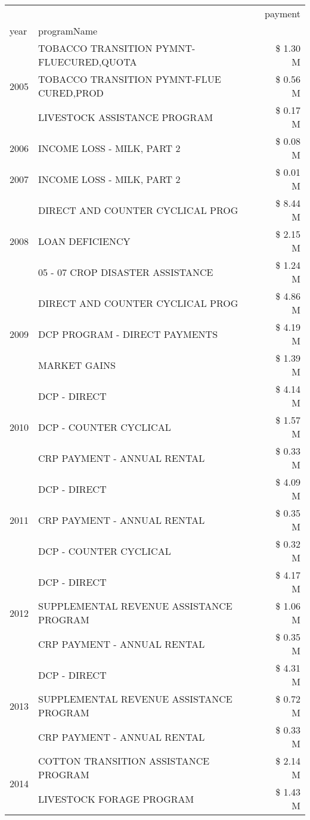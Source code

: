 \begin{tabular}{llr}
\toprule
 &  & payment \\
year & programName &  \\
\midrule
\multirow[t]{3}{*}{2005} & TOBACCO TRANSITION PYMNT-FLUECURED,QUOTA & \$ 1.30 M \\
 & TOBACCO TRANSITION PYMNT-FLUE CURED,PROD & \$ 0.56 M \\
 & LIVESTOCK ASSISTANCE PROGRAM & \$ 0.17 M \\
\cline{1-3}
2006 & INCOME LOSS - MILK, PART 2 & \$ 0.08 M \\
\cline{1-3}
2007 & INCOME LOSS - MILK, PART 2 & \$ 0.01 M \\
\cline{1-3}
\multirow[t]{3}{*}{2008} & DIRECT AND COUNTER CYCLICAL PROG & \$ 8.44 M \\
 & LOAN DEFICIENCY & \$ 2.15 M \\
 & 05 - 07 CROP DISASTER ASSISTANCE & \$ 1.24 M \\
\cline{1-3}
\multirow[t]{3}{*}{2009} & DIRECT AND COUNTER CYCLICAL PROG & \$ 4.86 M \\
 & DCP PROGRAM - DIRECT PAYMENTS & \$ 4.19 M \\
 & MARKET GAINS & \$ 1.39 M \\
\cline{1-3}
\multirow[t]{3}{*}{2010} & DCP - DIRECT & \$ 4.14 M \\
 & DCP - COUNTER CYCLICAL & \$ 1.57 M \\
 & CRP PAYMENT - ANNUAL RENTAL & \$ 0.33 M \\
\cline{1-3}
\multirow[t]{3}{*}{2011} & DCP - DIRECT & \$ 4.09 M \\
 & CRP PAYMENT - ANNUAL RENTAL & \$ 0.35 M \\
 & DCP - COUNTER CYCLICAL & \$ 0.32 M \\
\cline{1-3}
\multirow[t]{3}{*}{2012} & DCP - DIRECT & \$ 4.17 M \\
 & SUPPLEMENTAL REVENUE ASSISTANCE PROGRAM & \$ 1.06 M \\
 & CRP PAYMENT - ANNUAL RENTAL & \$ 0.35 M \\
\cline{1-3}
\multirow[t]{3}{*}{2013} & DCP - DIRECT & \$ 4.31 M \\
 & SUPPLEMENTAL REVENUE ASSISTANCE PROGRAM & \$ 0.72 M \\
 & CRP PAYMENT - ANNUAL RENTAL & \$ 0.33 M \\
\cline{1-3}
\multirow[t]{3}{*}{2014} & COTTON TRANSITION ASSISTANCE PROGRAM & \$ 2.14 M \\
 & LIVESTOCK FORAGE PROGRAM & \$ 1.43 M \\

\end{tabular}
